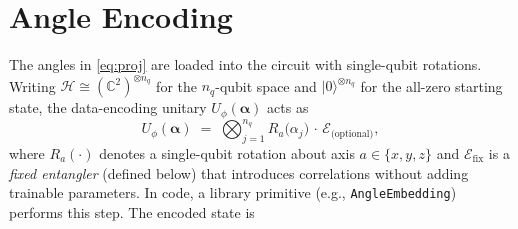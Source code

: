 \documentclass[11pt]{article}
\begin{document}
\section{Angle Encoding}

The angles in \eqref{eq:proj} are loaded into the circuit with single-qubit rotations. Writing $\mathcal{H}\cong(\mathbb{C}^2)^{\otimes n_q}$ for the $n_q$-qubit space and $\lvert 0\rangle^{\otimes n_q}$ for the all-zero starting state, the data-encoding unitary $U_\phi(\bm{\alpha})$ acts as
\begin{equation}
\label{eq:angle-embed}
U_\phi(\bm{\alpha})\;=\;\bigotimes_{j=1}^{n_q} R_{a}\big(\alpha_j\big)\,\cdot\,\mathcal{E}_{\text{(optional)}},
\end{equation}
where $R_{a}(\cdot)$ denotes a single-qubit rotation about axis $a\in\{x,y,z\}$ and $\mathcal{E}_{\mathrm{fix}}$ is a \emph{fixed entangler} (defined below) that introduces correlations without adding trainable parameters. In code, a library primitive (e.g., \texttt{AngleEmbedding}) performs this step. The encoded state is
\end{document}
